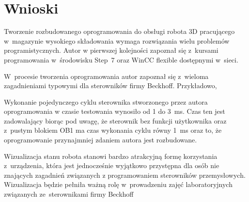 \section{Wnioski}
Tworzenie rozbudowanego oprogramowania do obsługi robota 3D pracującego w~magazynie wysokiego składowania wymaga rozwiązania wielu problemów programistycznych. Autor w pierwszej kolejności zapoznał się z~kursami programowania w~środowisku Step~7 oraz WinCC flexible \cite{kurs1,kurs2,kurs3} dostępnymi w~sieci.

W~procesie tworzenia oprogramowania autor zapoznał się z~wieloma zagadnieniami typowymi dla sterowników firmy Beckhoff. Przykładowo, 

Wykonanie pojedynczego cyklu sterownika stworzonego przez autora oprogramowania w czasie testowania wynosiło od 1 do 3~ms. Czas ten jest zadowalający biorąc pod uwagę, że sterownik bez funkcji użytkownika oraz z~pustym blokiem OB1 ma czas wykonania cyklu równy 1~ms oraz to, że oprogramowanie przynajmniej zdaniem autora jest rozbudowane.

Wizualizacja stanu robota stanowi bardzo atrakcyjną formę korzystania z~urządzenia, która jest jednocześnie wyjątkowo przystępna dla osób nie znających zagadnień związanych z programowaniem sterowników przemysłowych. Wizualizacja będzie pełniła ważną rolę w~prowadzeniu zajęć laboratoryjnych związanych ze~sterownikami firmy Beckhoff